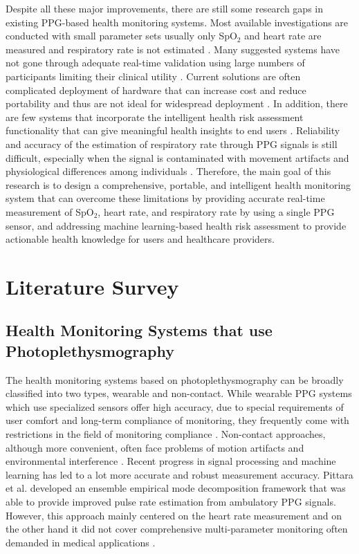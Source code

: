 \documentclass{ieeeaccess}
\begin{document}
Despite all these major improvements, there are still some research gaps in existing PPG-based health monitoring systems. Most available investigations are conducted with small parameter sets usually only SpO$_2$ and heart rate are measured and respiratory rate is not estimated \cite{b21}. Many suggested systems have not gone through adequate real-time validation using large numbers of participants limiting their clinical utility \cite{b22}. Current solutions are often complicated deployment of hardware that can increase cost and reduce portability and thus are not ideal for widespread deployment \cite{b23}. In addition, there are few systems that incorporate the intelligent health risk assessment functionality that can give meaningful health insights to end users \cite{b24}. Reliability and accuracy of the estimation of respiratory rate through PPG signals is still difficult, especially when the signal is contaminated with movement artifacts and physiological differences among individuals \cite{b25}. Therefore, the main goal of this research is to design a comprehensive, portable, and intelligent health monitoring system that can overcome these limitations by providing accurate real-time measurement of SpO$_2$, heart rate, and respiratory rate by using a single PPG sensor, and addressing machine learning-based health risk assessment to provide actionable health knowledge for users and healthcare providers.
\section{Literature Survey}
\label{sec:literature_survey}

\subsection{Health Monitoring Systems that use Photoplethysmography}

The health monitoring systems based on photoplethysmography can be broadly classified into two types, wearable and non-contact. While wearable PPG systems which use specialized sensors offer high accuracy, due to special requirements of user comfort and long-term compliance of monitoring, they frequently come with restrictions in the field of monitoring compliance \cite{b9}. Non-contact approaches, although more convenient, often face problems of motion artifacts and environmental interference \cite{b10}. Recent progress in signal processing and machine learning has led to a lot more accurate and robust measurement accuracy. Pittara et al. \cite{b2} developed an ensemble empirical mode decomposition framework that was able to provide improved pulse rate estimation from ambulatory PPG signals. However, this approach mainly centered on the heart rate measurement and on the other hand it did not cover comprehensive multi-parameter monitoring often demanded in medical applications \cite{b12}.
\end{document}
